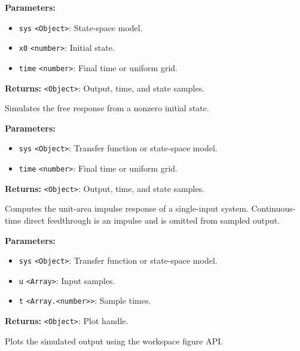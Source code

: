 \documentclass[12pt,a4paper]{article}
\begin{document}
\noindent \textbf{Parameters:}
\begin{itemize}
  \item \texttt{sys} \texttt{<Object>}: State-space model.
  \item \texttt{x0} \texttt{<number>}: Initial state.
  \item \texttt{time} \texttt{<number>}: Final time or uniform grid.
\end{itemize}

\noindent \textbf{Returns:} \texttt{<Object>}: Output, time, and state samples.

\noindent Simulates the free response from a nonzero initial state.

\vspace{5mm}
\noindent {}


\noindent \textbf{Parameters:}
\begin{itemize}
  \item \texttt{sys} \texttt{<Object>}: Transfer function or state-space model.
  \item \texttt{time} \texttt{<number>}: Final time or uniform grid.
\end{itemize}

\noindent \textbf{Returns:} \texttt{<Object>}: Output, time, and state samples.

\noindent Computes the unit-area impulse response of a single-input system.
Continuous-time direct feedthrough is an impulse and is omitted from sampled output.

\vspace{5mm}
\noindent {}


\noindent \textbf{Parameters:}
\begin{itemize}
  \item \texttt{sys} \texttt{<Object>}: Transfer function or state-space model.
  \item \texttt{u} \texttt{<Array>}: Input samples.
  \item \texttt{t} \texttt{<Array.<number>>}: Sample times.
\end{itemize}

\noindent \textbf{Returns:} \texttt{<Object>}: Plot handle.

\noindent Plots the simulated output using the workspace figure API.
\end{document}
